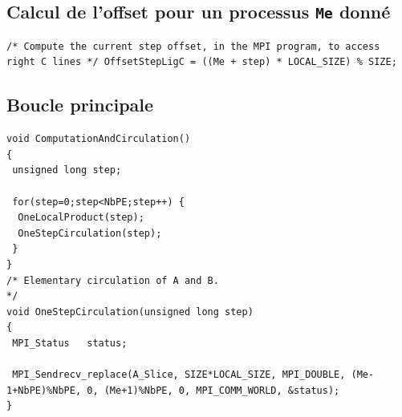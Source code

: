\documentclass[	DIV=calc,%
							paper=a4,%
							fontsize=11pt%
							]{scrartcl}	 					%
\begin{document}
\newpage

\subsection*{Calcul de l'offset pour un processus {\texttt{Me} donné}}
\begin{lstlisting}
/* Compute the current step offset, in the MPI program, to access right C lines */ OffsetStepLigC = ((Me + step) * LOCAL_SIZE) % SIZE; 
\end{lstlisting}

\subsection*{Boucle principale}
\begin{lstlisting}
void ComputationAndCirculation()
{
 unsigned long step;
 
 for(step=0;step<NbPE;step++) { 
  OneLocalProduct(step);
  OneStepCirculation(step);
 }
}
/* Elementary circulation of A and B.                                            */
void OneStepCirculation(unsigned long step)
{
 MPI_Status   status;

 MPI_Sendrecv_replace(A_Slice, SIZE*LOCAL_SIZE, MPI_DOUBLE, (Me-1+NbPE)%NbPE, 0, (Me+1)%NbPE, 0, MPI_COMM_WORLD, &status);
}


\end{lstlisting} 
\end{document}
